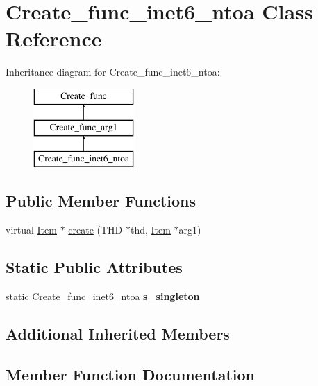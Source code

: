 \hypertarget{classCreate__func__inet6__ntoa}{}\section{Create\+\_\+func\+\_\+inet6\+\_\+ntoa Class Reference}
\label{classCreate__func__inet6__ntoa}
Inheritance diagram for Create\+\_\+func\+\_\+inet6\+\_\+ntoa\+:\begin{figure}[H]
\begin{center}
\leavevmode
\includegraphics[height=3.000000cm]{classCreate__func__inet6__ntoa}
\end{center}
\end{figure}
\subsection*{Public Member Functions}
\begin{DoxyCompactItemize}
\item 
virtual \mbox{\hyperlink{classItem}{Item}} $\ast$ \mbox{\hyperlink{classCreate__func__inet6__ntoa_a837a94032dd6bf13ea08f29d5b9db030}{create}} (T\+HD $\ast$thd, \mbox{\hyperlink{classItem}{Item}} $\ast$arg1)
\end{DoxyCompactItemize}
\subsection*{Static Public Attributes}
\begin{DoxyCompactItemize}
\item 
\mbox{\label{classCreate__func__inet6__ntoa_ad6561bbd313dade8d9ce618305bf63e0}} 
static \mbox{\hyperlink{classCreate__func__inet6__ntoa}{Create\+\_\+func\+\_\+inet6\+\_\+ntoa}} {\bfseries s\+\_\+singleton}
\end{DoxyCompactItemize}
\subsection*{Additional Inherited Members}


\subsection{Member Function Documentation}
\mbox{\label{classCreate__func__inet6__ntoa_a837a94032dd6bf13ea08f29d5b9db030}} 
